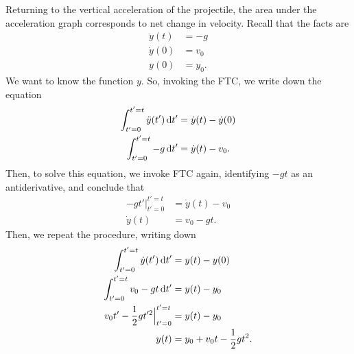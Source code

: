 Returning to the vertical acceleration of the projectile, the area under the acceleration graph
corresponds to net change in velocity. Recall that the facts are
\begin{align*}
    \ddot{y}(t) &= -g \\
    \dot{y}(0)  &= v_0 \\
    y(0)        &= y_0.
  \end{align*}
  We want to know the function $y$. So, invoking the FTC, we write down the equation
  \begin{align*}
    \int_{t'=0}^{t'=t}\ddot{y}(t') \dt' &= \dot{y}(t) - \dot{y}(0) \\
    \int_{t'=0}^{t'=t}-g \dt' &= \dot{y}(t) - v_0.
\end{align*}
Then, to solve this equation, we invoke FTC again, identifying $-gt$ as an antiderivative, and
conclude that
\begin{align*}
    -gt'\Big|_{t'=0}^{t'=t} &= \dot{y}(t) - v_0 \\
    \dot{y}(t)                   &= v_0 - gt.
\end{align*}
Then, we repeat the procedure, writing down
\begin{align*}
    \int_{t'=0}^{t'=t}\dot{y}(t') \dt' &= y(t) - y(0) \\
    \int_{t'=0}^{t'=t}v_0 - gt \dt'    &= y(t) - y_0 \\
    v_0t' - \frac{1}{2}gt'^2\Big|_{t'=0}^{t'=t} &= y(t) - y_0 \\
    y(t) &= y_0 + v_0t - \frac{1}{2}gt^2.
\end{align*}
